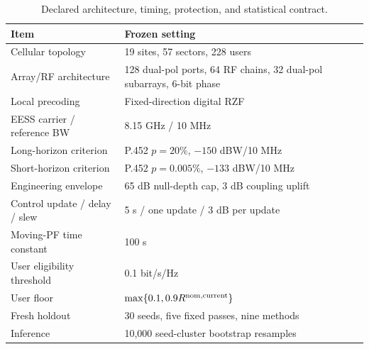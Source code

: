 \begin{table}[t]
\caption{Declared architecture, timing, protection, and statistical contract.}
\label{tab:parameters}
\centering
\footnotesize
\setlength{\tabcolsep}{3.0pt}
\renewcommand{\arraystretch}{1.08}
\begin{tabular}{@{}p{}p{}@{}}
\toprule
Item & Frozen setting\\
\midrule
Cellular topology & 19 sites, 57 sectors, 228 users\\
Array/RF architecture & 128 dual-pol ports, 64 RF chains, 32 dual-pol subarrays, 6-bit phase\\
Local precoding & Fixed-direction digital RZF\\
EESS carrier / reference BW & 8.15 GHz / 10 MHz\\
Long-horizon criterion & P.452 $p=20\%$, $-150$ dBW/10 MHz\\
Short-horizon criterion & P.452 $p=0.005\%$, $-133$ dBW/10 MHz\\
Engineering envelope & 65 dB null-depth cap, 3 dB coupling uplift\\
Control update / delay / slew & 5 s / one update / 3 dB per update\\
Moving-PF time constant & 100 s\\
User eligibility threshold & 0.1 bit/s/Hz\\
User floor & $\max\{0.1,0.9R^{\rm nom,current}\}$\\
Fresh holdout & 30 seeds, five fixed passes, nine methods\\
Inference & 10,000 seed-cluster bootstrap resamples\\
\bottomrule
\end{tabular}
\end{table}
